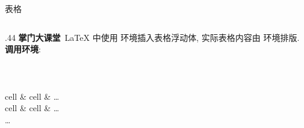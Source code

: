 \begin{frame}{表格}
	\begin{columns}[T, onlytextwidth]
		\begin{column}{.44\textwidth}
			\textbf{掌门大课堂}~\LaTeX{} 中使用  环境插入表格浮动体, 实际表格内容由  环境排版.\\[1ex]
			\textbf{调用环境}:\\
			\\
			\hspace*{1em}\\
			\hspace*{1em}\\
			\hspace*{2em}cell \& cell \& \ldots \cmd{\textbackslash}\\
			\hspace*{2em}cell \& cell \& \ldots \cmd{\textbackslash}\\
			\hspace*{2em}\ldots\\
			\hspace*{1em}\\
			\hspace*{1em}\\
			\\[1ex]


\end{column}
\end{columns}
\end{frame}
